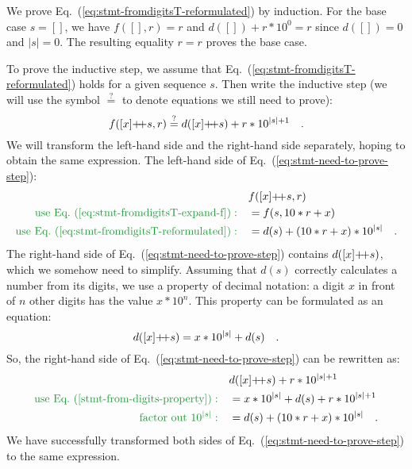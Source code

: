 We prove Eq.~(\ref{eq:stmt-fromdigitsT-reformulated}) by induction.
For the base case $s=\left[\right]$, we have $f(\left[\right],r)=r$
and $d(\left[\right])+r*10^{0}=r$ since $d(\left[\right])=0$ and
$\left|s\right|=0$. The resulting equality $r=r$ proves the base
case. 

To prove the inductive step, we assume that Eq.~(\ref{eq:stmt-fromdigitsT-reformulated})
holds for a given sequence $s$. Then write the inductive step (we
will use the symbol $\overset{?}{=}$ to denote equations we still
need to prove):
\begin{equation}
f([x]{\displaystyle }{+\negmedspace+} s,r)\overset{?}{=}d([x]{\displaystyle }{+\negmedspace+} s)+r*10^{\left|s\right|+1}\quad.\label{eq:stmt-need-to-prove-step}
\end{equation}
We will transform the left-hand side and the right-hand side separately,
hoping to obtain the same expression. The left-hand side of Eq.~(\ref{eq:stmt-need-to-prove-step}):
\begin{align*}
 & f([x]\pplus s,r)\\
{\color{greenunder}\text{use Eq.~(\ref{eq:stmt-fromdigitsT-expand-f})}:}\quad & =f(s,10*r+x)\\
{\color{greenunder}\text{use Eq.~(\ref{eq:stmt-fromdigitsT-reformulated})}:}\quad & =d(s)+\left(10*r+x\right)*10^{\left|s\right|}\quad.
\end{align*}
The right-hand side of Eq.~(\ref{eq:stmt-need-to-prove-step}) contains
$d([x]{\displaystyle }{+\negmedspace+} s)$, which we somehow need to simplify. Assuming that
$d(s)$ correctly calculates a number from its digits, we use a property
of decimal notation: a digit $x$ in front of $n$ other digits has
the value $x*10^{n}$. This property can be formulated as an equation:
\begin{equation}
d([x]{\displaystyle }{+\negmedspace+} s)=x*10^{\left|s\right|}+d(s)\quad.\label{stmt-from-digits-property}
\end{equation}
So, the right-hand side of Eq.~(\ref{eq:stmt-need-to-prove-step})
can be rewritten as:
\begin{align*}
 & d([x]\pplus s)+r*10^{\left|s\right|+1}\\
{\color{greenunder}\text{use Eq.~(\ref{stmt-from-digits-property})}:}\quad & =x*10^{\left|s\right|}+d(s)+r*10^{\left|s\right|+1}\\
{\color{greenunder}\text{factor out }10^{\left|s\right|}:}\quad & =d(s)+\left(10*r+x\right)*10^{\left|s\right|}\quad.
\end{align*}
We have successfully transformed both sides of Eq.~(\ref{eq:stmt-need-to-prove-step})
to the same expression.

